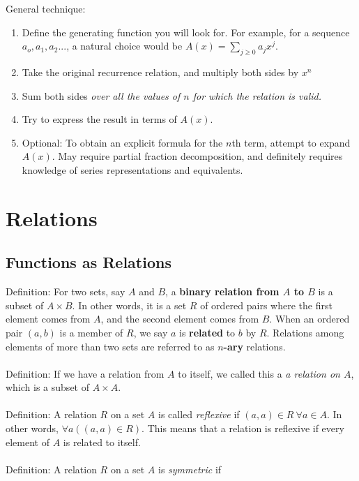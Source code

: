 \documentclass[a4paper,10pt]{report}
\begin{document}
General technique:
\begin{enumerate}
	\item
		Define the generating function you will look for.
		For example, for a sequence $a_o, a_1, a_2...$, a natural choice would be $A(x) = \sum_{j\geq0}a_jx^j$.
	\item
		Take the original recurrence relation, and multiply both sides by $x^n$
	\item
		Sum both sides \textit{over all the values of $n$ for which the relation is valid.}
	\item
		Try to express the result in terms of $A(x)$.
	\item
		Optional: To obtain an explicit formula for the $n$th term, attempt to expand $A(x)$. May require partial fraction decomposition, and definitely requires knowledge of series representations and equivalents.
\end{enumerate}



\chapter{Relations}
\section{Functions as Relations}
Definition: For two sets, say $A$ and $B$, a \textbf{binary relation from $A$ to $B$} is a subset of $A \times B$. In other words, it is a set $R$ of ordered pairs where the first element comes from $A$, and the second element comes from $B$. When an ordered pair $(a,b)$ is a member of $R$, we say $a$ is \textbf{related} to $b$ by $R$. Relations among elements of more than two sets are referred to as \textbf{$n$-ary } relations. \\ \\

Definition: If we have a relation from $A$ to itself, we called this a \textit{a relation on $A$}, which is a subset of $A \times A$. \\ \\

Definition: A relation $R$ on a set $A$ is called \textit{reflexive} if $(a,a) \in R ~\forall a \in A$. In other words, $\forall a((a,a)\in R)$. This means that a relation is reflexive if every element of $A$ is related to itself. \\ \\

Definition: A relation $R$ on a set $A$ is \textit{symmetric} if
\end{document}
